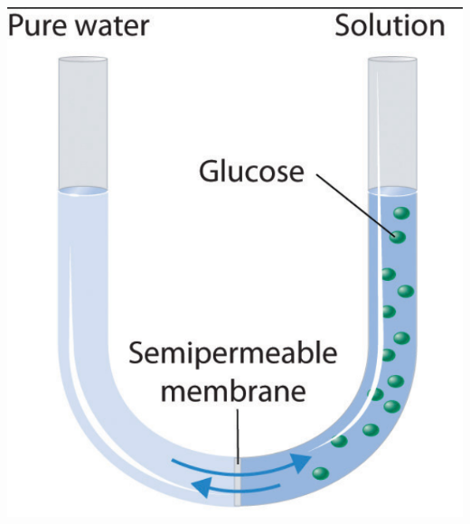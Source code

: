 \documentclass[12pt]{article}
\begin{document}
\begin{center}
  \includegraphics[scale=0.25]{osmotic_press}
\end{center}
\end{document}
